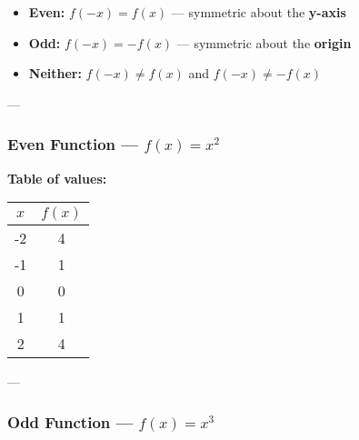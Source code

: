 \documentclass[11pt]{article}
\begin{document}
\begin{tcolorbox}[colback=blue!5!white, colframe=blue!80!black, title=Function Symmetry Rules]
\begin{itemize}
  \item \textbf{Even:} \( f(-x) = f(x) \) — symmetric about the \textbf{y-axis}
  \item \textbf{Odd:} \( f(-x) = -f(x) \) — symmetric about the \textbf{origin}
  \item \textbf{Neither:} \( f(-x) \ne f(x) \) and \( f(-x) \ne -f(x) \)
\end{itemize}
\end{tcolorbox}

---

\subsubsection*{Even Function — \( f(x) = x^2 \)}

\begin{minipage}{0.45\textwidth}
\end{minipage}
\begin{minipage}{0.5\textwidth}
\textbf{Table of values:}
\begin{center}
\begin{tabular}{|c|c|}
\hline
\( x \) & \( f(x) \) \\
\hline
-2 & 4 \\
-1 & 1 \\
0  & 0 \\
1  & 1 \\
2  & 4 \\
\hline
\end{tabular}
\end{center}
\end{minipage}

---

\subsubsection*{Odd Function — \( f(x) = x^3 \)}
\end{document}
